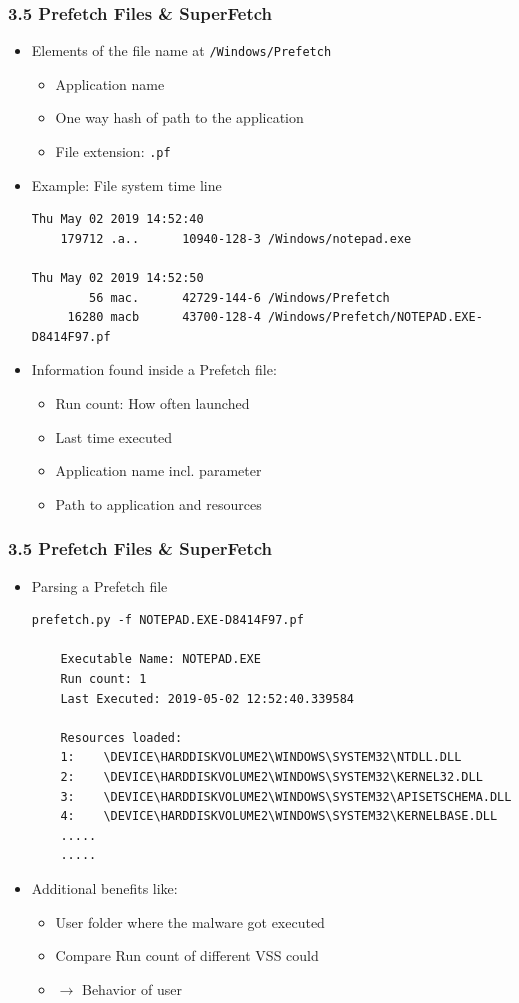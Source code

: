 \begin{frame}[fragile]
  \frametitle{3.5 Prefetch Files \& SuperFetch}
    \begin{itemize}
        \item Elements of the file name at \texttt{/Windows/Prefetch}
        \begin{itemize}
            \item Application name
            \item One way hash of path to the application
	    \item File extension: \texttt{.pf}
        \end{itemize}
        \item Example: File system time line
  \begin{lstlisting}[basicstyle=\tiny]
Thu May 02 2019 14:52:40
    179712 .a..      10940-128-3 /Windows/notepad.exe

Thu May 02 2019 14:52:50
        56 mac.      42729-144-6 /Windows/Prefetch
     16280 macb      43700-128-4 /Windows/Prefetch/NOTEPAD.EXE-D8414F97.pf
  \end{lstlisting}
        \item Information found inside a Prefetch file:
        \begin{itemize}
            \item Run count: How often launched
            \item Last time executed
            \item Application name incl. parameter
            \item Path to application and resources
        \end{itemize}
    \end{itemize}
\end{frame}


\begin{frame}[fragile]
  \frametitle{3.5 Prefetch Files \& SuperFetch}
    \begin{itemize}
        \item Parsing a Prefetch file
  \begin{lstlisting}[basicstyle=\tiny]
prefetch.py -f NOTEPAD.EXE-D8414F97.pf

	Executable Name: NOTEPAD.EXE
	Run count: 1
	Last Executed: 2019-05-02 12:52:40.339584

	Resources loaded:
	1:    \DEVICE\HARDDISKVOLUME2\WINDOWS\SYSTEM32\NTDLL.DLL
	2:    \DEVICE\HARDDISKVOLUME2\WINDOWS\SYSTEM32\KERNEL32.DLL
	3:    \DEVICE\HARDDISKVOLUME2\WINDOWS\SYSTEM32\APISETSCHEMA.DLL
	4:    \DEVICE\HARDDISKVOLUME2\WINDOWS\SYSTEM32\KERNELBASE.DLL
	.....
	.....
  \end{lstlisting}
        \item Additional benefits like:
        \begin{itemize}
            \item User folder where the malware got executed
            \item Compare Run count of different VSS could
	    \item[] $\to$ Behavior of user
        \end{itemize}
    \end{itemize}
\end{frame}


